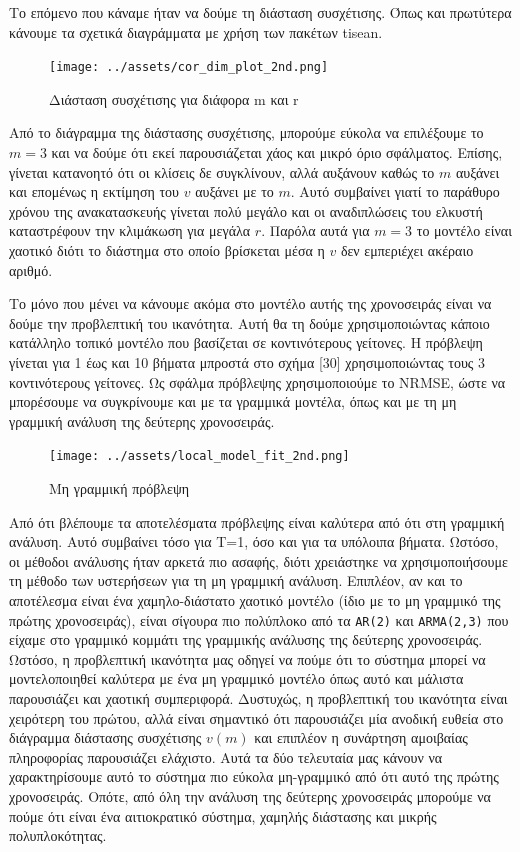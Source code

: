 \documentclass[11pt,]{article}
\begin{document}
Το επόμενο που κάναμε ήταν να δούμε τη διάσταση συσχέτισης. Όπως και
πρωτύτερα κάνουμε τα σχετικά διαγράμματα με χρήση των πακέτων tisean.

\begin{figure}
\centering
\texttt{[image: ../assets/cor\_dim\_plot\_2nd.png]}
\caption{Διάσταση συσχέτισης για διάφορα m και r}
\end{figure}

Από το διάγραμμα της διάστασης συσχέτισης, μπορούμε εύκολα να επιλέξουμε
το \(m=3\) και να δούμε ότι εκεί παρουσιάζεται χάος και μικρό όριο
σφάλματος. Επίσης, γίνεται κατανοητό ότι οι κλίσεις δε συγκλίνουν, αλλά
αυξάνουν καθώς το \(m\) αυξάνει και επομένως η εκτίμηση του \(v\)
αυξάνει με το \(m\). Αυτό συμβαίνει γιατί το παράθυρο χρόνου της
ανακατασκευής γίνεται πολύ μεγάλο και οι αναδιπλώσεις του ελκυστή
καταστρέφουν την κλιμάκωση για μεγάλα \(r\). Παρόλα αυτά για \(m=3\) το
μοντέλο είναι χαοτικό διότι το διάστημα στο οποίο βρίσκεται μέσα η \(v\)
δεν εμπεριέχει ακέραιο αριθμό.

Το μόνο που μένει να κάνουμε ακόμα στο μοντέλο αυτής της χρονοσειράς
είναι να δούμε την προβλεπτική του ικανότητα. Αυτή θα τη δούμε
χρησιμοποιώντας κάποιο κατάλληλο τοπικό μοντέλο που βασίζεται σε
κοντινότερους γείτονες. Η πρόβλεψη γίνεται για 1 έως και 10 βήματα
μπροστά στο σχήμα {[}30{]} χρησιμοποιώντας τους 3 κοντινότερους
γείτονες. Ως σφάλμα πρόβλεψης χρησιμοποιούμε το NRMSE, ώστε να
μπορέσουμε να συγκρίνουμε και με τα γραμμικά μοντέλα, όπως και με τη μη
γραμμική ανάλυση της δεύτερης χρονοσειράς.

\begin{figure}
\centering
\texttt{[image: ../assets/local\_model\_fit\_2nd.png]}
\caption{Μη γραμμική πρόβλεψη}
\end{figure}

Από ότι βλέπουμε τα αποτελέσματα πρόβλεψης είναι καλύτερα από ότι στη
γραμμική ανάλυση. Αυτό συμβαίνει τόσο για T=1, όσο και για τα υπόλοιπα
βήματα. Ωστόσο, οι μέθοδοι ανάλυσης ήταν αρκετά πιο ασαφής, διότι
χρειάστηκε να χρησιμοποιήσουμε τη μέθοδο των υστερήσεων για τη μη
γραμμική ανάλυση. Επιπλέον, αν και το αποτέλεσμα είναι ένα
χαμηλο-διάστατο χαοτικό μοντέλο (ίδιο με το μη γραμμικό της πρώτης
χρονοσειράς), είναι σίγουρα πιο πολύπλοκο από τα \texttt{AR(2)} και
\texttt{ARMA(2,3)} που είχαμε στο γραμμικό κομμάτι της γραμμικής
ανάλυσης της δεύτερης χρονοσειράς. Ωστόσο, η προβλεπτική ικανότητα μας
οδηγεί να πούμε ότι το σύστημα μπορεί να μοντελοποιηθεί καλύτερα με ένα
μη γραμμικό μοντέλο όπως αυτό και μάλιστα παρουσιάζει και χαοτική
συμπεριφορά. Δυστυχώς, η προβλεπτική του ικανότητα είναι χειρότερη του
πρώτου, αλλά είναι σημαντικό ότι παρουσιάζει μία ανοδική ευθεία στο
διάγραμμα διάστασης συσχέτισης \(v(m)\) και επιπλέον η συνάρτηση
αμοιβαίας πληροφορίας παρουσιάζει ελάχιστο. Αυτά τα δύο τελευταία μας
κάνουν να χαρακτηρίσουμε αυτό το σύστημα πιο εύκολα μη-γραμμικό από ότι
αυτό της πρώτης χρονοσειράς. Οπότε, από όλη την ανάλυση της δεύτερης
χρονοσειράς μπορούμε να πούμε ότι είναι ένα αιτιοκρατικό σύστημα,
χαμηλής διάστασης και μικρής πολυπλοκότητας.
\end{document}
